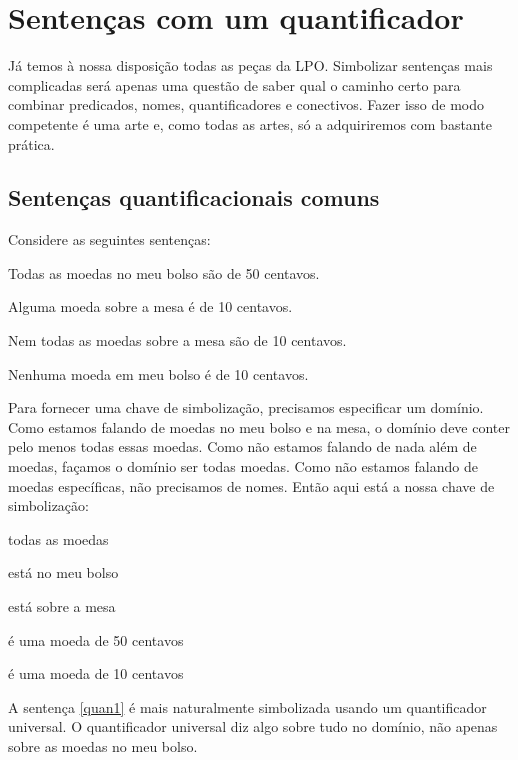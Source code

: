 \chapter{Sentenças com um quantificador}
\label{s:MoreMonadic}

Já temos à nossa disposição todas as peças da LPO.
Simbolizar sentenças mais complicadas será apenas uma questão de saber qual o caminho certo para combinar predicados, nomes, quantificadores e conectivos. Fazer isso de modo competente é uma arte e, como todas as artes,  só a adquiriremos com bastante prática.


\section{Sentenças quantificacionais comuns}
Considere as seguintes sentenças:
	\begin{earg}
		\item[\ex{quan1}] Todas as moedas no meu bolso são de 50 centavos.
		\item[\ex{quan2}] Alguma moeda sobre a mesa é de 10 centavos.
		\item[\ex{quan3}] Nem todas as moedas sobre a mesa são de 10 centavos.
		\item[\ex{quan4}] Nenhuma moeda em meu bolso é de 10 centavos.
	\end{earg}
Para fornecer uma chave de simbolização, precisamos especificar um domínio.
Como estamos falando de moedas no meu bolso e na mesa, o domínio deve conter pelo menos todas essas moedas.
Como não estamos falando de nada além de moedas, façamos o domínio ser todas moedas.
Como não estamos falando de moedas específicas, não precisamos de nomes.
Então aqui está a nossa chave de simbolização:
	\begin{center}
	\begin{ekey}
		\item[\text{domínio}] todas as moedas
		\item[\atom{B}{x}]  está no meu bolso
		\item[\atom{M}{x}]  está sobre a mesa
		\item[\atom{C}{x}]  é uma moeda de 50 centavos
		\item[\atom{D}{x}]  é uma moeda de 10 centavos
	\end{ekey}
	\end{center}
A sentença \ref{quan1} é mais naturalmente simbolizada usando um quantificador universal.
O quantificador universal diz algo sobre tudo no domínio, não apenas sobre as moedas no meu bolso.
